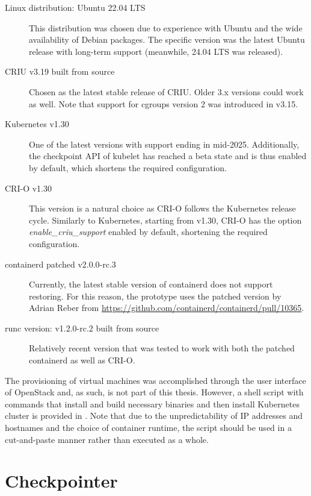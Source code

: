 \documentclass[
  digital,     %
  oneside,     %
  nosansbold,  %
  nocolorbold, %
  lof,         %
  nolot,         %
]{fithesis4}
\begin{document}
\begin{description}
    \item[Linux distribution: Ubuntu 22.04 LTS] This distribution was chosen due to experience with Ubuntu and the wide availability of Debian packages. The specific version was the latest Ubuntu release with long-term support (meanwhile, 24.04 LTS was released).
    
    \item[CRIU v3.19 built from source] Chosen as the latest stable release of CRIU. Older 3.x versions could work as well. Note that support for cgroups version 2 was introduced in v3.15.
    
    \item[Kubernetes v1.30] One of the latest versions with support ending in mid-2025. Additionally, the checkpoint API of kubelet has reached a beta state and is thus enabled by default, which shortens the required configuration.

    \item[CRI-O v1.30] This version is a natural choice as CRI-O follows the Kubernetes release cycle. Similarly to Kubernetes, starting from v1.30, CRI-O has the option \emph{enable\_criu\_support} enabled by default, shortening the required configuration.
        
    \item[containerd patched v2.0.0-rc.3] Currently, the latest stable version of containerd does not support restoring. For this reason, the prototype uses the patched version by Adrian Reber from \url{https://github.com/containerd/containerd/pull/10365}.

    \item[runc version: v1.2.0-rc.2 built from source] Relatively recent version that was tested to work with both the patched containerd as well as CRI-O. %

\end{description}

The provisioning of virtual machines was accomplished through the user interface of OpenStack and, as such, is not part of this thesis. However, a shell script with commands that install and build necessary binaries and then install Kubernetes cluster is provided in . Note that due to the unpredictability of IP addresses and hostnames and the choice of container runtime, the script should be used in a cut-and-paste manner rather than executed as a whole.


\chapter{Checkpointer}
\label{chap:checkpointer}
\end{document}
